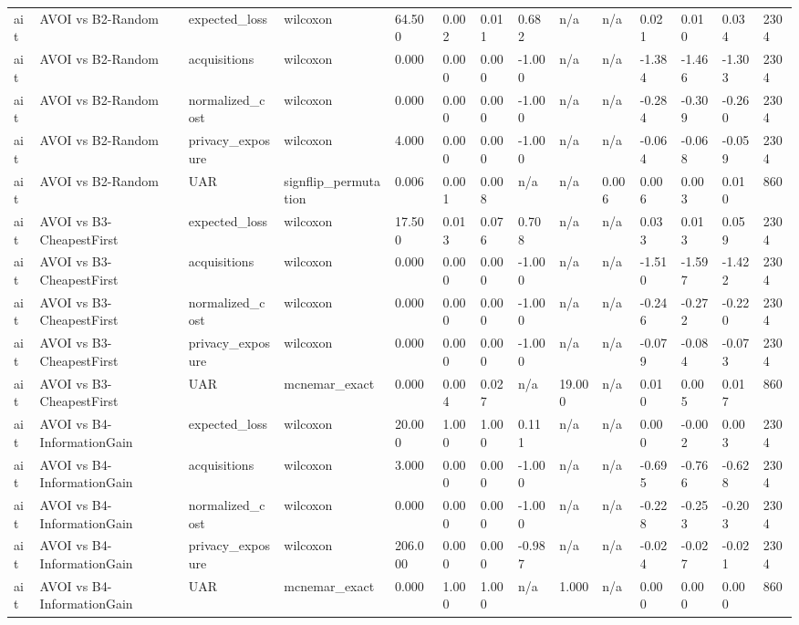 \begin{table}[!ht]
{\begin{tabular}{llllllllllllll}
ait & AVOI vs B2-Random & expected\_loss & wilcoxon & 64.500 & 0.002 & 0.011 & 0.682 & n/a & n/a & 0.021 & 0.010 & 0.034 & 2304 \\
ait & AVOI vs B2-Random & acquisitions & wilcoxon & 0.000 & 0.000 & 0.000 & -1.000 & n/a & n/a & -1.384 & -1.466 & -1.303 & 2304 \\
ait & AVOI vs B2-Random & normalized\_cost & wilcoxon & 0.000 & 0.000 & 0.000 & -1.000 & n/a & n/a & -0.284 & -0.309 & -0.260 & 2304 \\
ait & AVOI vs B2-Random & privacy\_exposure & wilcoxon & 4.000 & 0.000 & 0.000 & -1.000 & n/a & n/a & -0.064 & -0.068 & -0.059 & 2304 \\
ait & AVOI vs B2-Random & UAR & signflip\_permutation & 0.006 & 0.001 & 0.008 & n/a & n/a & 0.006 & 0.006 & 0.003 & 0.010 & 860 \\
ait & AVOI vs B3-CheapestFirst & expected\_loss & wilcoxon & 17.500 & 0.013 & 0.076 & 0.708 & n/a & n/a & 0.033 & 0.013 & 0.059 & 2304 \\
ait & AVOI vs B3-CheapestFirst & acquisitions & wilcoxon & 0.000 & 0.000 & 0.000 & -1.000 & n/a & n/a & -1.510 & -1.597 & -1.422 & 2304 \\
ait & AVOI vs B3-CheapestFirst & normalized\_cost & wilcoxon & 0.000 & 0.000 & 0.000 & -1.000 & n/a & n/a & -0.246 & -0.272 & -0.220 & 2304 \\
ait & AVOI vs B3-CheapestFirst & privacy\_exposure & wilcoxon & 0.000 & 0.000 & 0.000 & -1.000 & n/a & n/a & -0.079 & -0.084 & -0.073 & 2304 \\
ait & AVOI vs B3-CheapestFirst & UAR & mcnemar\_exact & 0.000 & 0.004 & 0.027 & n/a & 19.000 & n/a & 0.010 & 0.005 & 0.017 & 860 \\
ait & AVOI vs B4-InformationGain & expected\_loss & wilcoxon & 20.000 & 1.000 & 1.000 & 0.111 & n/a & n/a & 0.000 & -0.002 & 0.003 & 2304 \\
ait & AVOI vs B4-InformationGain & acquisitions & wilcoxon & 3.000 & 0.000 & 0.000 & -1.000 & n/a & n/a & -0.695 & -0.766 & -0.628 & 2304 \\
ait & AVOI vs B4-InformationGain & normalized\_cost & wilcoxon & 0.000 & 0.000 & 0.000 & -1.000 & n/a & n/a & -0.228 & -0.253 & -0.203 & 2304 \\
ait & AVOI vs B4-InformationGain & privacy\_exposure & wilcoxon & 206.000 & 0.000 & 0.000 & -0.987 & n/a & n/a & -0.024 & -0.027 & -0.021 & 2304 \\
ait & AVOI vs B4-InformationGain & UAR & mcnemar\_exact & 0.000 & 1.000 & 1.000 & n/a & 1.000 & n/a & 0.000 & 0.000 & 0.000 & 860 \\

\end{tabular}}
\end{table}
